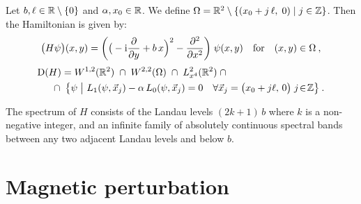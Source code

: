 \begin{defn}
    Let $b, \ell \in \mathbb{R} \setminus \{0\}$ and $\alpha, x_0 \in \mathbb{R}$. We define $\Omega = \mathbb{R}^2 \setminus \{ (x_0 + j \, \ell, \; 0) \;|\; j \in \mathbb{Z} \}$. Then the Hamiltonian is given by:
    \begin{equation*}
        \big( H\psi \big)(x, y)
        = \bigg(
            \big(-\mathrm{i}\frac{\partial }{\partial y} + b \, x \Big)^2 - \frac{\partial ^2}{\partial x^2}
        \bigg) \; \psi(x, y)
        \quad
        \text{for}
        \quad
        (x, y) \in \Omega
        \: ,
    \end{equation*}
    \begin{align*}
        \Domain(H)
        &= W^{1,2}(\R^2)
        \;\cap\; W^{2,2}(\Omega)
        \;\cap\; L^2_{x^4}(\R^2)
        \;\cap \\
        &\hspace{-10pt}
        \cap\;
        \big\{
            \psi
            \;\big|\
            L_1(\psi, \vec x_j)
            - \alpha \, L_0(\psi, \vec x_j)
            = 0
            \quad
            \forall \vec x_j =
            \big( x_0 + j \ell, \, 0 \big)
            \; j \!\in\! \Z
        \big\}
        \:.
    \end{align*}
\end{defn}
\begin{thm}
    The spectrum of $H$ consists of the Landau levels $(2k + 1) \, b$ where $k$ is a non-negative integer, and an infinite family of absolutely continuous spectral bands between any two adjacent Landau levels and below $b$.
\end{thm}

\section{Magnetic perturbation}
\label{section-known-magnetic}

